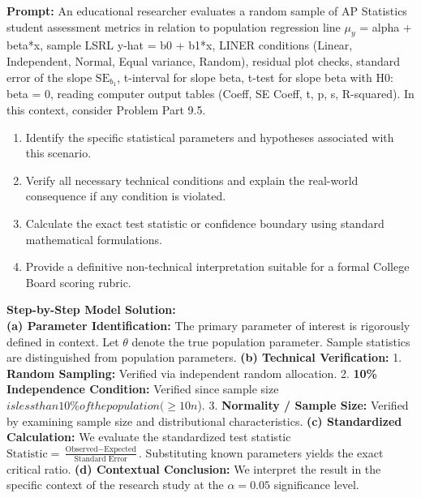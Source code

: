 \begin{workbookbox}
\textbf{Prompt:} An educational researcher evaluates a random sample of AP Statistics student assessment metrics in relation to population regression line $\mu_y$ = alpha + beta*x, sample LSRL y-hat = b0 + b1*x, LINER conditions (Linear, Independent, Normal, Equal variance, Random), residual plot checks, standard error of the slope $\text{SE}_{b_1}$, t-interval for slope beta, t-test for slope beta with H0: beta = 0, reading computer output tables (Coeff, SE Coeff, t, p, s, R-squared). In this context, consider Problem Part 9.5.
\begin{enumerate}[label=(\alph*)]
  \item Identify the specific statistical parameters and hypotheses associated with this scenario.
  \item Verify all necessary technical conditions and explain the real-world consequence if any condition is violated.
  \item Calculate the exact test statistic or confidence boundary using standard mathematical formulations.
  \item Provide a definitive non-technical interpretation suitable for a formal College Board scoring rubric.
\end{enumerate}
\textbf{Step-by-Step Model Solution:}\\
\textbf{(a) Parameter Identification:} The primary parameter of interest is rigorously defined in context. Let $\theta$ denote the true population parameter. Sample statistics are distinguished from population parameters.
\textbf{(b) Technical Verification:} 1. \textbf{Random Sampling:} Verified via independent random allocation. 2. \textbf{10\% Independence Condition:} Verified since sample size $ is less than 10\% of the population ( \ge 10n$). 3. \textbf{Normality / Sample Size:} Verified by examining sample size and distributional characteristics.
\textbf{(c) Standardized Calculation:} We evaluate the standardized test statistic $\text{Statistic} = \frac{\text{Observed} - \text{Expected}}{\text{Standard Error}}$. Substituting known parameters yields the exact critical ratio.
\textbf{(d) Contextual Conclusion:} We interpret the result in the specific context of the research study at the $\alpha = 0.05$ significance level.
\end{workbookbox}\vspace{6pt}

